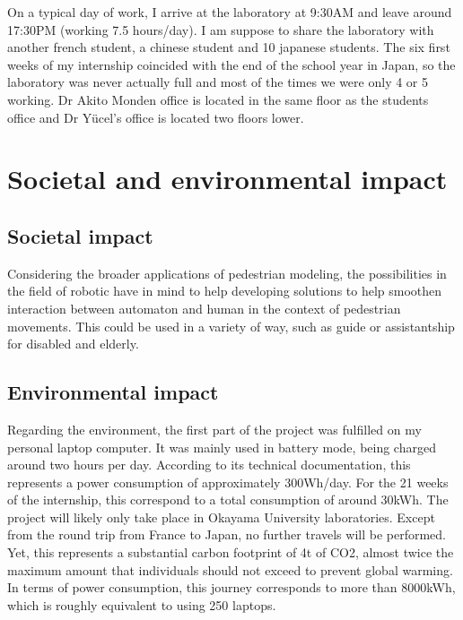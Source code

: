 \documentclass[12pt,a4paper,twoside]{article}
\begin{document}
On a typical day of work, I arrive at the laboratory at 9:30AM and leave around 17:30PM (working 7.5 hours/day). I am suppose to share the laboratory with another french student, a chinese student and 10 japanese students. The six first weeks of my internship coincided with the end of the school year in Japan, so the laboratory was never actually full and most of the times we were only 4 or 5 working. Dr Akito Monden office is located in the same floor as the students office and Dr Yücel's office is located two floors lower.
\section{Societal and environmental impact}

\subsection{Societal impact}
Considering the broader applications of pedestrian modeling, the possibilities in the field of robotic have in mind to help developing solutions to help smoothen interaction between automaton and human in the context of pedestrian movements. This could be used in a variety of way, such as guide or assistantship for disabled and elderly. 

\subsection{Environmental impact}
Regarding the environment, the first part of the project was fulfilled on my personal laptop computer. It was mainly used in battery mode, being charged around two hours per day. According to its technical documentation, this represents a power consumption of approximately 300Wh/day. For the 21 weeks of the internship, this correspond to a total consumption of around 30kWh.
The project will likely only take place in Okayama University laboratories. Except from the round trip from France to Japan, no further travels will be performed. Yet, this represents a substantial carbon footprint of 4t of CO2, almost twice the maximum amount that individuals should not exceed to prevent global warming. In terms of power consumption, this journey corresponds to more than 8000kWh, which is roughly equivalent to using 250 laptops. 

{}

\end{document}
